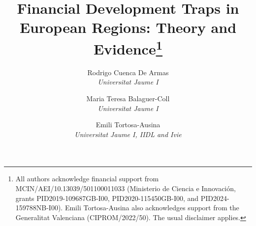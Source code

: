\documentclass[a4paper,11pt,oneside]{article}
\begin{document}








\title{\textbf{Financial Development Traps in European Regions: Theory and Evidence}\thanks{\color{black}All authors acknowledge financial support from MCIN/AEI/10.13039/501100011033 (Ministerio de Ciencia e Innovación, grants PID2019-109687GB-I00, PID2020-115450GB-I00, and PID2024-159788NB-I00). Emili Tortosa-Ausina also acknowledges support from the Generalitat Valenciana (CIPROM/2022/50). The usual disclaimer applies.}}



\author{\normalsize Rodrigo Cuenca De Armas \\ \textsl{\footnotesize Universitat Jaume I} \and \normalsize Maria Teresa Balaguer-Coll \\ \textsl{\footnotesize Universitat Jaume I} \and \normalsize Emili Tortosa-Ausina \\ \textsl{\footnotesize Universitat Jaume I, IIDL and Ivie}}











%




% 

%

%

\end{document}
